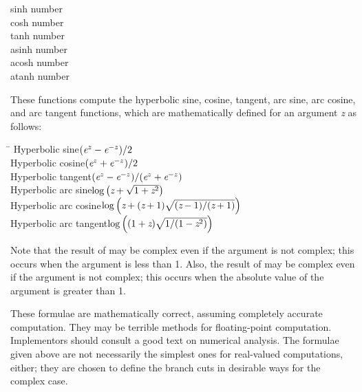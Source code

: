 \begin{defun}[Function]
sinh number \\
cosh number \\
tanh number \\
asinh number \\
acosh number \\
atanh number

These functions compute the hyperbolic sine, cosine, tangent,
arc sine, arc cosine, and arc tangent functions, which are mathematically
defined for an argument \emph{z} as follows:

\begin{tabbing}
\hskip 10pc\=\kill
Hyperbolic sine\>$ (\emph{e}^{z}-\emph{e}^{-z})/2 $ \\
Hyperbolic cosine\>$ (\emph{e}^{z}+\emph{e}^{-z})/2 $ \\
Hyperbolic tangent\>$ (\emph{e}^{z}-\emph{e}^{-z})/(\emph{e}^{z}+\emph{e}^{-z}) $ \\[2pt]
Hyperbolic arc sine\>$ \log \left(\emph{z}+\sqrt{1+\emph{z}^2}\right) $ \\[2pt]
Hyperbolic arc cosine\>$ \log
\left(\emph{z}+(\emph{z}+1)\sqrt{(\emph{z}-1)/(\emph{z}+1)}\right) $ \\[2pt]
Hyperbolic arc tangent\>$ \log \left((1+\emph{z})\sqrt{1/(1-\emph{z}^2)}\right) $
\end{tabbing}

Note that the result of  may be
complex even if the argument is not complex; this occurs
when the argument is less than 1.
Also, the result of  may be
complex even if the argument is not complex; this occurs
when the absolute value of the argument is greater than 1.

\beforenoterule
\begin{implementation}
These formulae are mathematically correct, assuming
completely accurate computation.  They may be terrible methods for
floating-point computation.  Implementors should consult a good text on
numerical analysis.  The formulae given above are not necessarily
the simplest ones for real-valued computations, either; they are chosen
to define the branch cuts in desirable ways for the complex case.
\end{implementation}
\afternoterule


\end{defun}
